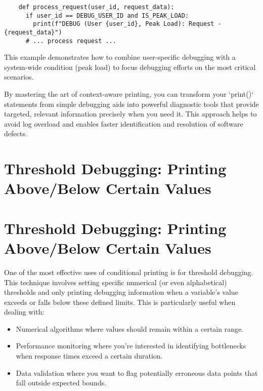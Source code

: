 \documentclass{article}
\begin{document}
{{{\begin{itemize}
\begin{verbatim}
    def process_request(user_id, request_data):
      if user_id == DEBUG_USER_ID and IS_PEAK_LOAD:
        print(f"DEBUG (User {user_id}, Peak Load): Request - {request_data}")
      # ... process request ...
    \end{verbatim}
    This example demonstrates how to combine user-specific debugging with a system-wide condition (peak load) to focus debugging efforts on the most critical scenarios.
\end{itemize}

By mastering the art of context-aware printing, you can transform your `print()` statements from simple debugging aids into powerful diagnostic tools that provide targeted, relevant information precisely when you need it. This approach helps to avoid log overload and enables faster identification and resolution of software defects.

\newpage

\section*{Threshold Debugging: Printing Above/Below Certain Values} %
\label{chapter-5-6-Threshold_Debugging__Printing_Above_Belo}

\section*{Threshold Debugging: Printing Above/Below Certain Values}

One of the most effective uses of conditional printing is for threshold debugging. This technique involves setting specific numerical (or even alphabetical) thresholds and only printing debugging information when a variable's value exceeds or falls below these defined limits. This is particularly useful when dealing with:

\begin{itemize}
    \item Numerical algorithms where values should remain within a certain range.
    \item Performance monitoring where you're interested in identifying bottlenecks when response times exceed a certain duration.
    \item Data validation where you want to flag potentially erroneous data points that fall outside expected bounds.
\end{itemize}

}}}
\end{document}
